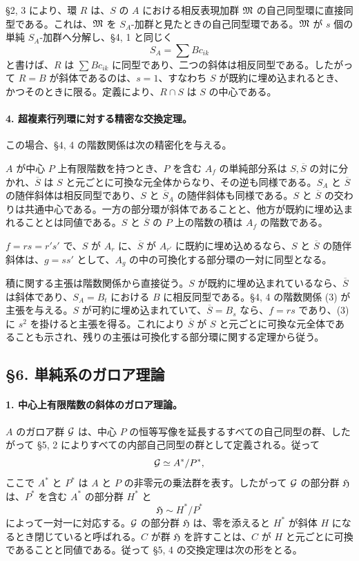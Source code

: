 §2, 3 により、環 \(R\) は、\(S\) の \(A\) における相反表現加群 \(\mathfrak M\) の自己同型環に直接同型である。これは、\(\mathfrak M\) を \(S_A\)-加群と見たときの自己同型環である。\(\mathfrak M\) が \(s\) 個の単純 \(S_A\)-加群へ分解し、§4, 1 と同じく
\[
        S_A=\sum Bc_{ik}
\]
と書けば、\(R\) は \(\sum Bc_{ik}\) に同型であり、二つの斜体は相反同型である。したがって \(R=B\) が斜体であるのは、\(s=1\)、すなわち \(S\) が既約に埋め込まれるとき、かつそのときに限る。定義により、\(R\cap S\) は \(S\) の中心である。

\paragraph{4. 超複素行列環に対する精密な交換定理。}
この場合、§4, 4 の階数関係は次の精密化を与える。

\(A\) が中心 \(P\) 上有限階数を持つとき、\(P\) を含む \(A_f\) の単純部分系は \(S,\overline S\) の対に分かれ、\(\overline S\) は \(S\) と元ごとに可換な元全体からなり、その逆も同様である。\(S_A\) と \(\overline S\) の随伴斜体は相反同型であり、\(S\) と \(\overline S_A\) の随伴斜体も同様である。\(S\) と \(\overline S\) の交わりは共通中心である。一方の部分環が斜体であることと、他方が既約に埋め込まれることとは同値である。\(S\) と \(\overline S\) の \(P\) 上の階数の積は \(A_f\) の階数である。

\(f=rs=r's'\) で、\(S\) が \(A_r\) に、\(\overline S\) が \(A_{r'}\) に既約に埋め込めるなら、\(S\) と \(\overline S\) の随伴斜体は、\(g=ss'\) として、\(A_g\) の中の可換化する部分環の一対に同型となる。

積に関する主張は階数関係から直接従う。\(S\) が既約に埋め込まれているなら、\(\overline S\) は斜体であり、\(S_A=B_t\) における \(B\) に相反同型である。§4, 4 の階数関係 (3) が主張を与える。\(S\) が可約に埋め込まれていて、\(\overline S=B_s\) なら、\(f=rs\) であり、(3) に \(s^2\) を掛けると主張を得る。これにより \(\overline S\) が \(S\) と元ごとに可換な元全体であることも示され、残りの主張は可換化する部分環に関する定理から従う。

\subsection*{§6. 単純系のガロア理論}

\paragraph{1. 中心上有限階数の斜体のガロア理論。}
\(A\) のガロア群 \(\mathcal G\) は、中心 \(P\) の恒等写像を延長するすべての自己同型の群、したがって §5, 2 によりすべての内部自己同型の群として定義される。従って
\[
        \mathcal G \simeq A^*/P^*,
\]
ここで \(A^*\) と \(P^*\) は \(A\) と \(P\) の非零元の乗法群を表す。したがって \(\mathcal G\) の部分群 \(\mathfrak H\) は、\(P^*\) を含む \(A^*\) の部分群 \(H^*\) と
\[
        \mathfrak H\sim H^*/P^*
\]
によって一対一に対応する。\(\mathcal G\) の部分群 \(\mathfrak H\) は、零を添えると \(H^*\) が斜体 \(H\) になるとき閉じていると呼ばれる。\(C\) が群 \(\mathfrak H\) を許すことは、\(C\) が \(H\) と元ごとに可換であることと同値である。従って §5, 4 の交換定理は次の形をとる。

